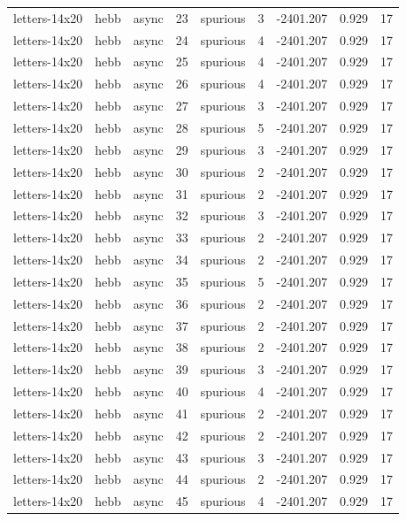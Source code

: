 \begin{tabular}{lllrlrrrr}
letters-14x20 & hebb & async & 23 & spurious & 3 & -2401.207 & 0.929 & 17 \\
letters-14x20 & hebb & async & 24 & spurious & 4 & -2401.207 & 0.929 & 17 \\
letters-14x20 & hebb & async & 25 & spurious & 4 & -2401.207 & 0.929 & 17 \\
letters-14x20 & hebb & async & 26 & spurious & 4 & -2401.207 & 0.929 & 17 \\
letters-14x20 & hebb & async & 27 & spurious & 3 & -2401.207 & 0.929 & 17 \\
letters-14x20 & hebb & async & 28 & spurious & 5 & -2401.207 & 0.929 & 17 \\
letters-14x20 & hebb & async & 29 & spurious & 3 & -2401.207 & 0.929 & 17 \\
letters-14x20 & hebb & async & 30 & spurious & 2 & -2401.207 & 0.929 & 17 \\
letters-14x20 & hebb & async & 31 & spurious & 2 & -2401.207 & 0.929 & 17 \\
letters-14x20 & hebb & async & 32 & spurious & 3 & -2401.207 & 0.929 & 17 \\
letters-14x20 & hebb & async & 33 & spurious & 2 & -2401.207 & 0.929 & 17 \\
letters-14x20 & hebb & async & 34 & spurious & 2 & -2401.207 & 0.929 & 17 \\
letters-14x20 & hebb & async & 35 & spurious & 5 & -2401.207 & 0.929 & 17 \\
letters-14x20 & hebb & async & 36 & spurious & 2 & -2401.207 & 0.929 & 17 \\
letters-14x20 & hebb & async & 37 & spurious & 2 & -2401.207 & 0.929 & 17 \\
letters-14x20 & hebb & async & 38 & spurious & 2 & -2401.207 & 0.929 & 17 \\
letters-14x20 & hebb & async & 39 & spurious & 3 & -2401.207 & 0.929 & 17 \\
letters-14x20 & hebb & async & 40 & spurious & 4 & -2401.207 & 0.929 & 17 \\
letters-14x20 & hebb & async & 41 & spurious & 2 & -2401.207 & 0.929 & 17 \\
letters-14x20 & hebb & async & 42 & spurious & 2 & -2401.207 & 0.929 & 17 \\
letters-14x20 & hebb & async & 43 & spurious & 3 & -2401.207 & 0.929 & 17 \\
letters-14x20 & hebb & async & 44 & spurious & 2 & -2401.207 & 0.929 & 17 \\
letters-14x20 & hebb & async & 45 & spurious & 4 & -2401.207 & 0.929 & 17 \\

\end{tabular}
